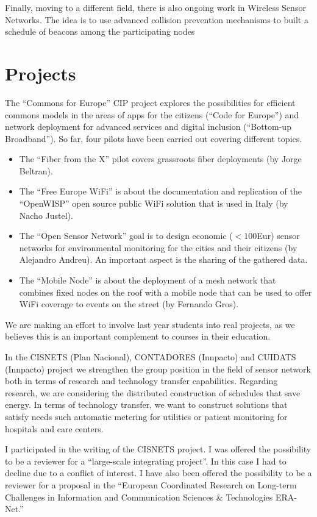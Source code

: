 \documentclass[a4paper,twocolumns]{article}%
\begin{document}
Finally, moving to a different field, there is also ongoing work in Wireless Sensor Networks.
The idea is to use advanced collision prevention mechanisms to built a schedule of beacons among the participating nodes \cite{cano2013iri}

\section{Projects}

The ``Commons for Europe'' CIP project explores the possibilities for efficient commons models in the areas of apps for the citizens (``Code for Europe'') and network deployment for advanced services and digital inclusion (``Bottom-up Broadband'').
So far, four pilots have been carried out covering different topics.
\begin{itemize}
\item The ``Fiber from the X'' pilot covers grassroots fiber deployments (by Jorge Beltran).
\item The ``Free Europe WiFi'' is about the documentation and replication of the ``OpenWISP'' open source public WiFi solution that is used in Italy (by Nacho Justel).
\item The ``Open Sensor Network'' goal is to design economic ($<100$Eur) sensor networks for environmental monitoring for the cities and their citizens (by Alejandro Andreu). 
An important aspect is the sharing of the gathered data.
\item The ``Mobile Node'' is about the deployment of a mesh network that combines fixed nodes on the roof with a mobile node that can be used to offer WiFi coverage to events on the street (by Fernando Gros).
\end{itemize}

We are making an effort to involve last year students into real projects, as we believes this is an important complement to courses in their education.

In the CISNETS (Plan Nacional), CONTADORES (Innpacto) and CUIDATS (Innpacto) project we strengthen the group position in the field of sensor network both in terms of research and technology transfer capabilities.
Regarding research, we are considering the distributed construction of schedules that save energy.
In terms of technology transfer, we want to construct solutions that satisfy needs such automatic metering for utilities or patient monitoring for hospitals and care centers.

I participated in the writing of the CISNETS project.
I was offered the possibility to be a reviewer for a ``large-scale integrating project''.
In this case I had to decline due to a conflict of interest.
I have also been offered the possibility to be a reviewer for a proposal in the ``European Coordinated Research on Long-term Challenges in Information and Communication Sciences \& Technologies ERA-Net.''
\end{document}
